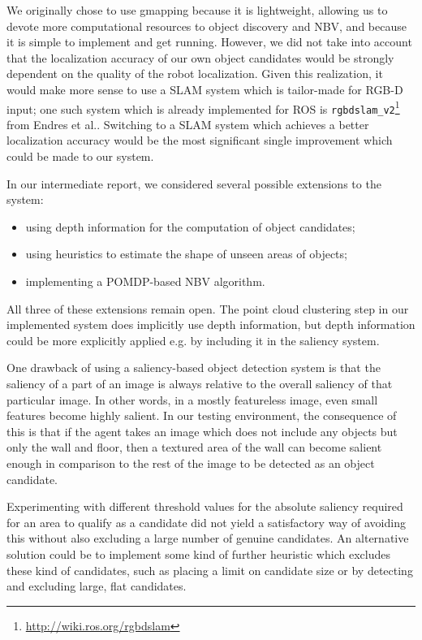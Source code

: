 We originally chose to use gmapping because it is lightweight, allowing us to devote more computational resources to object discovery and NBV, and because it is simple to implement and get running.
However, we did not take into account that the localization accuracy of our own object candidates would be strongly dependent on the quality of the robot localization.
Given this realization, it would make more sense to use a SLAM system which is tailor-made for RGB-D input; one such system which is already implemented for ROS is \texttt{rgbdslam\_v2}\footnote{\url{http://wiki.ros.org/rgbdslam}} from Endres et al.\cite{endres2014rgbdslam}.
Switching to a SLAM system which achieves a better localization accuracy would be the most significant single improvement which could be made to our system.

In our intermediate report, we considered several possible extensions to the system:
\begin{itemize}
	\setlength\itemsep{1pt}
	\item using depth information for the computation of object candidates;
	\item using heuristics to estimate the shape of unseen areas of objects;
	\item implementing a POMDP-based NBV algorithm.
\end{itemize}

All three of these extensions remain open.
The point cloud clustering step in our implemented system does implicitly use depth information, but depth information could be more explicitly applied e.g. by including it in the saliency system.

One drawback of using a saliency-based object detection system is that the saliency of a part of an image is always relative to the overall saliency of that particular image.
In other words, in a mostly featureless image, even small features become highly salient.
In our testing environment, the consequence of this is that if the agent takes an image which does not include any objects but only the wall and floor, then a textured area of the wall can become salient enough in comparison to the rest of the image to be detected as an object candidate.

Experimenting with different threshold values for the absolute saliency required for an area to qualify as a candidate did not yield a satisfactory way of avoiding this without also excluding a large number of genuine candidates.
An alternative solution could be to implement some kind of further heuristic which excludes these kind of candidates, such as placing a limit on candidate size or by detecting and excluding large, flat candidates.

